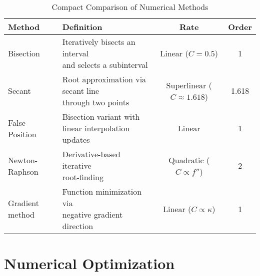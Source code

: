 \begin{table}[htbp]
    \centering
    \begin{tabularx}{\textwidth}{|l|X|c|c|}
        \hline
        \textbf{Method} & \textbf{Definition} & \textbf{Rate} & \textbf{Order} \\
        \hline
        Bisection & 
        \makecell[l]{Iteratively bisects an interval \\ and selects a subinterval} 
        & Linear ($C = 0.5$) & 1 \\
        \hline
        Secant & 
        \makecell[l]{Root approximation via secant line \\ through two points} 
        & Superlinear ($C \approx 1.618$) & 1.618 \\
        \hline
        False Position & 
        \makecell[l]{Bisection variant with \\ linear interpolation updates} 
        & Linear & 1 \\
        \hline
        Newton-Raphson & 
        \makecell[l]{Derivative-based iterative \\ root-finding} 
        & Quadratic ($C \propto f''$) & 2 \\
        \hline
        Gradient method & 
        \makecell[l]{Function minimization via \\ negative gradient direction} 
        & Linear ($C \propto \kappa$) & 1 \\
        \hline
    \end{tabularx}
    \caption{Compact Comparison of Numerical Methods}
    \label{tab:comparison_compact}
\end{table}

\section{Numerical Optimization}









